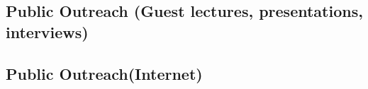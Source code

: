 \documentclass[12pt,english]{scrartcl}
\begin{document}
\subsection{Public Outreach (Guest lectures, presentations, interviews)}

\begin{comment}

\raggedright\vspace{2mm}\textbf{Activity}
\begin{itemize}
\item Presentations \cite{moore2018building2,blas2018protecting,deloso2018parasitoid,moore2018freecell,moore2018coconut,moore2018biological2,moore2018freecell2,marshall2018progress,moore2018attempted,moore2017impactof,moore2018biological,moore2018building,moore2017invasion,moore2017coconut,moore2017usingfree,moore2017accessto,moore2017biological,moore2017thecoconut,moore2017biological2,moore2017biological3}
\item Workshops \cite{berringer2018sixteenth,moore2017bringyour,moore2018cnasworkshop,quitugua20182018coconut}
\item Press \cite{moore2018special,varietyuogseeks,pacific2018scientists,2018viralcontrol,postnewtree,leonguerrero2018interview,2018g2ghuman,2017tracking}
\end{itemize}
\raggedright\vspace{2mm}\textbf{Reference(s)}

\begin{btSect}[vancouver]{zotero}
\btPrintCited
\end{btSect}
\newpage{}
\end{btUnit}

\begin{btUnit}

\end{comment}

\subsection{Public Outreach(Internet)}
\end{document}
